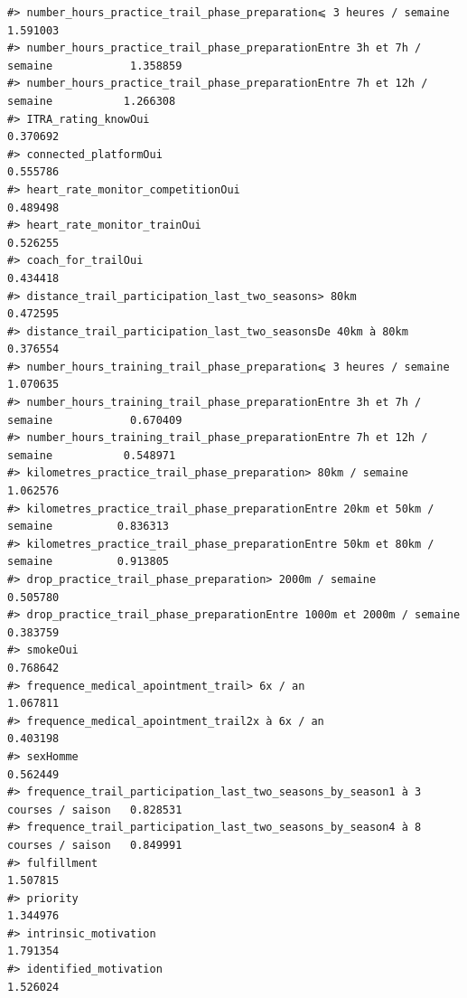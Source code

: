 \documentclass[
]{article}
\begin{document}
\begin{verbatim}
#> number_hours_practice_trail_phase_preparation⩽ 3 heures / semaine                1.591003
#> number_hours_practice_trail_phase_preparationEntre 3h et 7h / semaine            1.358859
#> number_hours_practice_trail_phase_preparationEntre 7h et 12h / semaine           1.266308
#> ITRA_rating_knowOui                                                              0.370692
#> connected_platformOui                                                            0.555786
#> heart_rate_monitor_competitionOui                                                0.489498
#> heart_rate_monitor_trainOui                                                      0.526255
#> coach_for_trailOui                                                               0.434418
#> distance_trail_participation_last_two_seasons> 80km                              0.472595
#> distance_trail_participation_last_two_seasonsDe 40km à 80km                      0.376554
#> number_hours_training_trail_phase_preparation⩽ 3 heures / semaine                1.070635
#> number_hours_training_trail_phase_preparationEntre 3h et 7h / semaine            0.670409
#> number_hours_training_trail_phase_preparationEntre 7h et 12h / semaine           0.548971
#> kilometres_practice_trail_phase_preparation> 80km / semaine                      1.062576
#> kilometres_practice_trail_phase_preparationEntre 20km et 50km / semaine          0.836313
#> kilometres_practice_trail_phase_preparationEntre 50km et 80km / semaine          0.913805
#> drop_practice_trail_phase_preparation> 2000m / semaine                           0.505780
#> drop_practice_trail_phase_preparationEntre 1000m et 2000m / semaine              0.383759
#> smokeOui                                                                         0.768642
#> frequence_medical_apointment_trail> 6x / an                                      1.067811
#> frequence_medical_apointment_trail2x à 6x / an                                   0.403198
#> sexHomme                                                                         0.562449
#> frequence_trail_participation_last_two_seasons_by_season1 à 3 courses / saison   0.828531
#> frequence_trail_participation_last_two_seasons_by_season4 à 8 courses / saison   0.849991
#> fulfillment                                                                      1.507815
#> priority                                                                         1.344976
#> intrinsic_motivation                                                             1.791354
#> identified_motivation                                                            1.526024

\end{verbatim}
\end{document}
